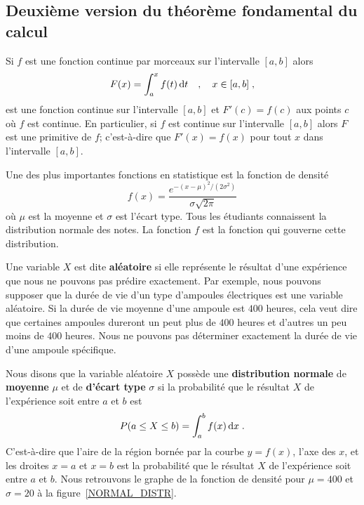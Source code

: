 {\subsection{Deuxième version du théorème fondamental du calcul}

\begin{focus}{\thm}
Si $f$ est une fonction continue par morceaux sur l'intervalle $[a,b]$
alors
\[
F(x) = \int_a^x f(t) \,\mathrm{d}t  \quad , \quad x\in [a,b] \; ,
\]
est une fonction continue sur l'intervalle $[a,b]$ et $F'(c) = f(c)$
aux points $c$ où $f$ est continue.  En particulier, si $f$ est
continue sur l'intervalle $[a,b]$ alors $F$ est une primitive de $f$;
c'est-à-dire que $F'(x) = f(x)$ pour tout $x$ dans l'intervalle
$[a,b]$.
\end{focus}

\begin{egg}
Une des plus importantes fonctions en statistique est la fonction de
densité
\[
f(x) = \frac{e^{-(x-\mu)^2/(2\sigma^2)}}{\sigma \sqrt{2\pi}}
\]
où $\mu$ est la moyenne et $\sigma$ est l'écart type.   Tous les
étudiants connaissent la distribution normale des notes.  La fonction
$f$ est la fonction qui gouverne cette distribution.

Une variable $X$ est dite {\bfseries aléatoire} si elle représente le
résultat d'une expérience que nous ne pouvons pas prédire exactement.
Par exemple, nous pouvons supposer que la durée de vie d'un type d'ampoules
électriques est une variable aléatoire.  Si
la durée de vie moyenne d'une ampoule est $400$ heures,
cela veut dire que certaines ampoules dureront un peut plus de $400$
heures et d'autres un peu moins de $400$ heures.  Nous ne pouvons pas
déterminer exactement la durée de vie d'une ampoule spécifique.

Nous disons que la variable aléatoire $X$ possède une
{\bfseries distribution normale} de
{\bfseries moyenne} $\mu$ et de {\bfseries d'écart type} $\sigma$ si
la probabilité que le résultat $X$ de l'expérience soit entre $a$ et
$b$ est
\[
P(a\leq X \leq b) = \int_a^b f(x) \,\mathrm{d}x \; .
\]
C'est-à-dire que l'aire de la région bornée par la courbe
$y=f(x)$, l'axe des $x$, et les droites $x=a$ et $x=b$ est la
probabilité que le résultat $X$ de l'expérience soit entre $a$ et
$b$. Nous retrouvons le graphe de la fonction de densité pour
$\mu=400$ et $\sigma =20$ à la figure~\ref{NORMAL_DISTR}.


\end{egg}}
